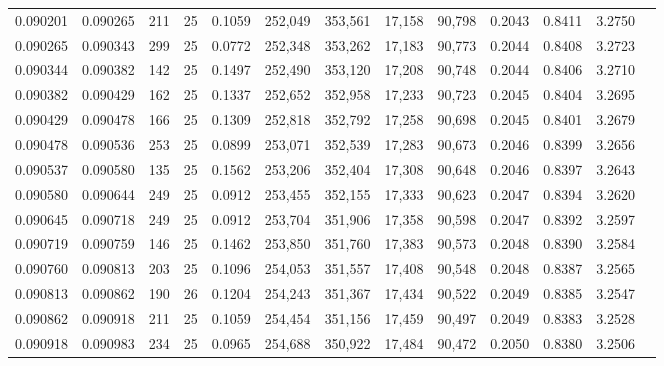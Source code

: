 \begin{tabular}{rrrrrrrrrrrrr}
0.090201 & 0.090265 &   211 &  25 &                                     0.1059 & 252,049 & 353,561 &  17,158 &  90,798 & 0.2043 & 0.8411 & 3.2750 \\
0.090265 & 0.090343 &   299 &  25 &                                     0.0772 & 252,348 & 353,262 &  17,183 &  90,773 & 0.2044 & 0.8408 & 3.2723 \\
0.090344 & 0.090382 &   142 &  25 &                                     0.1497 & 252,490 & 353,120 &  17,208 &  90,748 & 0.2044 & 0.8406 & 3.2710 \\
0.090382 & 0.090429 &   162 &  25 &                                     0.1337 & 252,652 & 352,958 &  17,233 &  90,723 & 0.2045 & 0.8404 & 3.2695 \\
0.090429 & 0.090478 &   166 &  25 &                                     0.1309 & 252,818 & 352,792 &  17,258 &  90,698 & 0.2045 & 0.8401 & 3.2679 \\
0.090478 & 0.090536 &   253 &  25 &                                     0.0899 & 253,071 & 352,539 &  17,283 &  90,673 & 0.2046 & 0.8399 & 3.2656 \\
0.090537 & 0.090580 &   135 &  25 &                                     0.1562 & 253,206 & 352,404 &  17,308 &  90,648 & 0.2046 & 0.8397 & 3.2643 \\
0.090580 & 0.090644 &   249 &  25 &                                     0.0912 & 253,455 & 352,155 &  17,333 &  90,623 & 0.2047 & 0.8394 & 3.2620 \\
0.090645 & 0.090718 &   249 &  25 &                                     0.0912 & 253,704 & 351,906 &  17,358 &  90,598 & 0.2047 & 0.8392 & 3.2597 \\
0.090719 & 0.090759 &   146 &  25 &                                     0.1462 & 253,850 & 351,760 &  17,383 &  90,573 & 0.2048 & 0.8390 & 3.2584 \\
0.090760 & 0.090813 &   203 &  25 &                                     0.1096 & 254,053 & 351,557 &  17,408 &  90,548 & 0.2048 & 0.8387 & 3.2565 \\
0.090813 & 0.090862 &   190 &  26 &                                     0.1204 & 254,243 & 351,367 &  17,434 &  90,522 & 0.2049 & 0.8385 & 3.2547 \\
0.090862 & 0.090918 &   211 &  25 &                                     0.1059 & 254,454 & 351,156 &  17,459 &  90,497 & 0.2049 & 0.8383 & 3.2528 \\
0.090918 & 0.090983 &   234 &  25 &                                     0.0965 & 254,688 & 350,922 &  17,484 &  90,472 & 0.2050 & 0.8380 & 3.2506 \\

\end{tabular}
